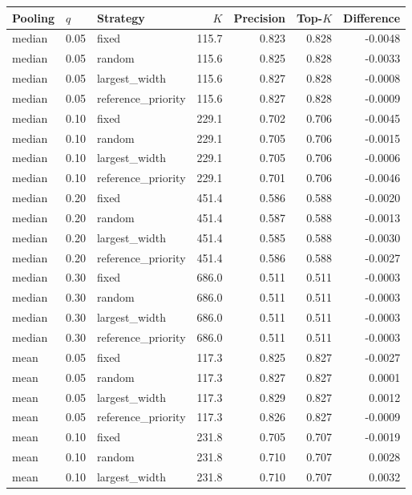 \begin{table}[t]
\centering\small
\begin{tabular}{lllr rrr}
\toprule
Pooling & $q$ & Strategy & $K$ & Precision & Top-$K$ & Difference \\
\midrule
median & 0.05 & fixed & 115.7 & 0.823 & 0.828 & -0.0048 \\
median & 0.05 & random & 115.6 & 0.825 & 0.828 & -0.0033 \\
median & 0.05 & largest\_width & 115.6 & 0.827 & 0.828 & -0.0008 \\
median & 0.05 & reference\_priority & 115.6 & 0.827 & 0.828 & -0.0009 \\
median & 0.10 & fixed & 229.1 & 0.702 & 0.706 & -0.0045 \\
median & 0.10 & random & 229.1 & 0.705 & 0.706 & -0.0015 \\
median & 0.10 & largest\_width & 229.1 & 0.705 & 0.706 & -0.0006 \\
median & 0.10 & reference\_priority & 229.1 & 0.701 & 0.706 & -0.0046 \\
median & 0.20 & fixed & 451.4 & 0.586 & 0.588 & -0.0020 \\
median & 0.20 & random & 451.4 & 0.587 & 0.588 & -0.0013 \\
median & 0.20 & largest\_width & 451.4 & 0.585 & 0.588 & -0.0030 \\
median & 0.20 & reference\_priority & 451.4 & 0.586 & 0.588 & -0.0027 \\
median & 0.30 & fixed & 686.0 & 0.511 & 0.511 & -0.0003 \\
median & 0.30 & random & 686.0 & 0.511 & 0.511 & -0.0003 \\
median & 0.30 & largest\_width & 686.0 & 0.511 & 0.511 & -0.0003 \\
median & 0.30 & reference\_priority & 686.0 & 0.511 & 0.511 & -0.0003 \\
mean & 0.05 & fixed & 117.3 & 0.825 & 0.827 & -0.0027 \\
mean & 0.05 & random & 117.3 & 0.827 & 0.827 & 0.0001 \\
mean & 0.05 & largest\_width & 117.3 & 0.829 & 0.827 & 0.0012 \\
mean & 0.05 & reference\_priority & 117.3 & 0.826 & 0.827 & -0.0009 \\
mean & 0.10 & fixed & 231.8 & 0.705 & 0.707 & -0.0019 \\
mean & 0.10 & random & 231.8 & 0.710 & 0.707 & 0.0028 \\
mean & 0.10 & largest\_width & 231.8 & 0.710 & 0.707 & 0.0032 \\

\end{tabular}
\end{table}
